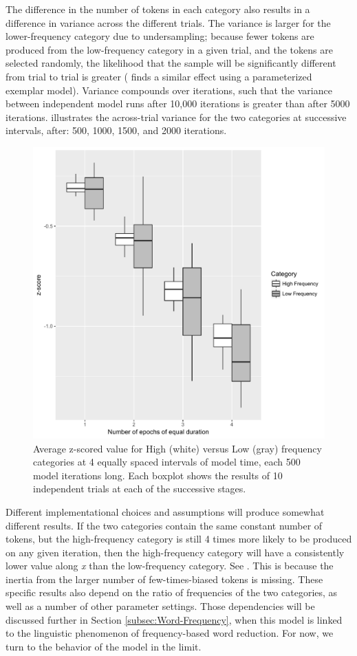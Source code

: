 The difference in the number of tokens in each category also results
in a difference in variance across the different trials. The variance
is larger for the lower-frequency category due to undersampling; because
fewer tokens are produced from the low-frequency category in a given
trial, and the tokens are selected randomly, the likelihood that the
sample will be significantly different from trial to trial is greater
(\citet{Soskuthy} finds a similar effect using a parameterized exemplar
model). Variance compounds over iterations, such that the variance
between independent model runs after 10,000 iterations is greater
than after 5000 iterations.  illustrates
the across-trial variance for the two categories at successive intervals,
after: 500, 1000, 1500, and 2000 iterations.

\begin{figure}[H]
\centering{}\includegraphics[width=.75\textwidth]{figures/FrequencyOverTime.pdf}\caption{\label{fig:Frequency Catch Up}Average z-scored value for High (white)
versus Low (gray) frequency categories at 4 equally spaced intervals
of model time, each 500 model iterations long. Each boxplot shows
the results of 10 independent trials at each of the successive stages.}
\end{figure}

Different implementational choices and assumptions will produce somewhat
different results. If the two categories contain the same constant
number of tokens, but the high-frequency category is still 4 times
more likely to be produced on any given iteration, then the high-frequency
category will have a consistently lower value along \emph{x} than
the low-frequency category. See .
This is because the inertia from the larger number of few-times-biased
tokens is missing. These specific results also depend on the ratio
of frequencies of the two categories, as well as a number of other
parameter settings. Those dependencies will be discussed further in
Section \ref{subsec:Word-Frequency}, when this model is linked to
the linguistic phenomenon of frequency-based word reduction. For now,
we turn to the behavior of the model in the limit.


